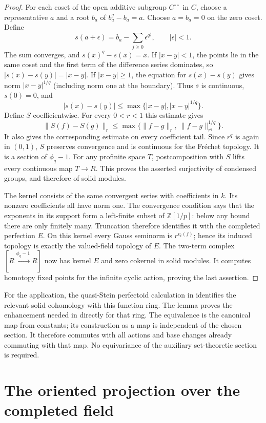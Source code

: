 \documentclass[11pt]{article}
\numberwithin{equation}{section}
\theoremstyle{definition}
\theoremstyle{remark}
\newcommand{\Z}{\mathbb Z}
\begin{document}
\begin{proof}
For each coset of the open additive subgroup $C^{\circ\circ}$ in $C$,
choose a representative $a$ and a root $b_a$ of $b_a^q-b_a=a$.
Choose $a=b_a=0$ on the zero coset.  Define
\[
 s(a+\epsilon)=b_a-\sum_{j\ge0}\epsilon^{q^j},
 \qquad |\epsilon|<1.
\]
The sum converges, and $s(x)^q-s(x)=x$.
If $|x-y|<1$, the points lie in the same coset and the first term
of the difference series dominates, so $|s(x)-s(y)|=|x-y|$.
If $|x-y|\ge1$, the equation for $s(x)-s(y)$ gives norm
$|x-y|^{1/q}$ (including norm one at the boundary).
Thus $s$ is continuous, $s(0)=0$, and
\[
 |s(x)-s(y)|\le\max\{|x-y|,|x-y|^{1/q}\}.
\]
Define $S$ coefficientwise.  For every $0<r<1$ this estimate gives
\[
 \|S(f)-S(g)\|_r
 \le\max\{\|f-g\|_r,\ \|f-g\|_{r^q}^{1/q}\}.
\]
It also gives the corresponding estimate on every coefficient tail.
Since $r^q$ is again in $(0,1)$, $S$ preserves convergence and is
continuous for the Fr\'echet topology.  It is a section of $\phi_q-1$.
For any profinite space $T$, postcomposition with $S$ lifts every
continuous map $T\to R$.  This proves the asserted surjectivity of
condensed groups, and therefore of solid modules.

The kernel consists of the same convergent series with coefficients in
$k$.  Its nonzero coefficients all have norm one.  The convergence
condition says that the exponents in its support form a left-finite
subset of $\Z[1/p]$: below any bound there are only finitely many.
Truncation therefore identifies it with the completed perfection $E$.
On this kernel every Gauss seminorm is $r^{v_t(f)}$; hence its induced
topology is exactly the valued-field topology of $E$.
The two-term complex $[R\xrightarrow{\phi_q-1}R]$ now has kernel
$E$ and zero cokernel in solid modules.  It computes homotopy fixed
points for the infinite cyclic action, proving the last assertion.
\end{proof}

For the application, the quasi-Stein perfectoid calculation in
\cite[Lemma~3.6.2]{BMR2026} identifies the relevant solid cohomology
with this function ring.  The lemma proves the enhancement needed in
\cite[Corollary~3.6.8]{BMR2026} directly for that ring.
The equivalence is the canonical map from constants; its construction
as a map is independent of the chosen section.  It therefore commutes
with all actions and base changes already commuting with that map.
No equivariance of the auxiliary set-theoretic section is required.

\section{The oriented projection over the completed field}
\label{app:oriented-projection}
\end{document}
